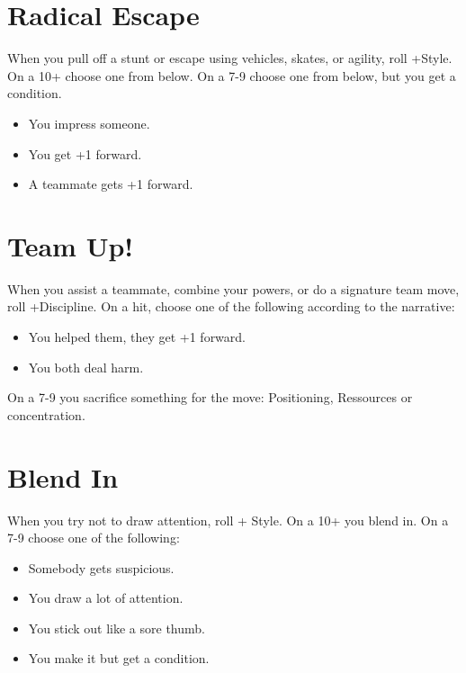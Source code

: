 \documentclass{book}
\begin{document}
\section*{Radical Escape}
When you pull off a stunt or escape using vehicles, skates, or agility, roll +Style. On a 10+ choose one from below. On a 7-9 choose one from below, but you get a condition.
\begin{itemize}
    \item You impress someone.
    \item You get +1 forward.
    \item A teammate gets +1 forward.
\end{itemize}

\section*{Team Up!}
When you assist a teammate, combine your powers, or do a signature team move, roll +Discipline. On a hit, choose one of the following according to the narrative:
\begin{itemize}
    \item You helped them, they get +1 forward.
    \item You both deal harm.
\end{itemize}
On a 7-9 you sacrifice something for the move: Positioning, Ressources or concentration. 

\section*{Blend In}
When you try not to draw attention, roll + Style. On a 10+ you blend in. On a 7-9 choose one of the following:
\begin{itemize}
    \item Somebody gets suspicious.
    \item You draw a lot of attention.
    \item You stick out like a sore thumb.
    \item You make it but get a condition.
\end{itemize}
\end{document}

